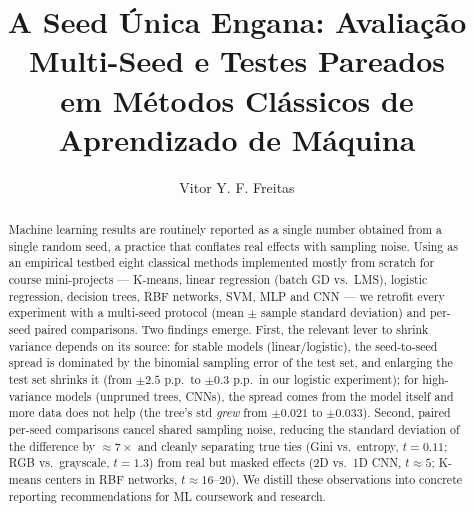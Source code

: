 \documentclass[12pt]{article}
\title{A Seed Única Engana: Avaliação Multi-Seed e Testes Pareados\\ em Métodos Clássicos de Aprendizado de Máquina}
\author{Vitor Y. F. Freitas\inst{1}}
\begin{document}
\maketitle

\begin{abstract}
  Machine learning results are routinely reported as a single number obtained
  from a single random seed, a practice that conflates real effects with
  sampling noise. Using as an empirical testbed eight classical methods
  implemented mostly from scratch for course mini-projects --- K-means, linear
  regression (batch GD vs.\ LMS), logistic regression, decision trees, RBF
  networks, SVM, MLP and CNN --- we retrofit every experiment with a
  multi-seed protocol (mean $\pm$ sample standard deviation) and per-seed
  paired comparisons. Two findings emerge. First, the relevant lever to shrink
  variance depends on its source: for stable models (linear/logistic), the
  seed-to-seed spread is dominated by the binomial sampling error of the test
  set, and enlarging the test set shrinks it (from $\pm 2.5$ p.p.\ to $\pm
  0.3$ p.p.\ in our logistic experiment); for high-variance models (unpruned
  trees, CNNs), the spread comes from the model itself and more data does not
  help (the tree's std \emph{grew} from $\pm 0.021$ to $\pm 0.033$). Second,
  paired per-seed comparisons cancel shared sampling noise, reducing the
  standard deviation of the difference by $\approx 7\times$ and cleanly
  separating true ties (Gini vs.\ entropy, $t=0.11$; RGB vs.\ grayscale,
  $t=1.3$) from real but masked effects (2D vs.\ 1D CNN, $t\approx 5$;
  K-means centers in RBF networks, $t\approx 16$--$20$). We distill these
  observations into concrete reporting recommendations for ML coursework and
  research.
\end{abstract}
\end{document}
